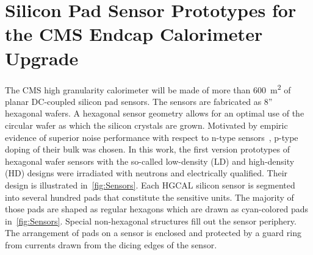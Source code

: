 \section{Silicon Pad Sensor Prototypes for the CMS Endcap Calorimeter Upgrade}
\label{sec:sensors}

The CMS high granularity calorimeter will be made of more than \SI{600}{\metre\squared} of planar DC-coupled silicon pad sensors.
The sensors are fabricated as 8'' hexagonal wafers.
A hexagonal sensor geometry allows for an optimal use of the circular wafer as which the silicon crystals are grown.
Motivated by empiric evidence of superior noise performance with respect to n-type sensors~\cite{Adam_2017}, p-type doping of their bulk was chosen.%
In this work, the first version prototypes of hexagonal wafer sensors with the so-called low-density (LD) and high-density (HD) designs were irradiated with neutrons and electrically qualified.
Their design is illustrated in~\ref{fig:Sensors}.
Each HGCAL silicon sensor is segmented into several hundred pads that constitute the sensitive units. 
The majority of those pads are shaped as regular hexagons which are drawn as cyan-colored pads in~\ref{fig:Sensors}.
Special non-hexagonal structures fill out the sensor periphery.
The arrangement of pads on a sensor is enclosed and protected by a guard ring from currents drawn from the dicing edges of the sensor.

